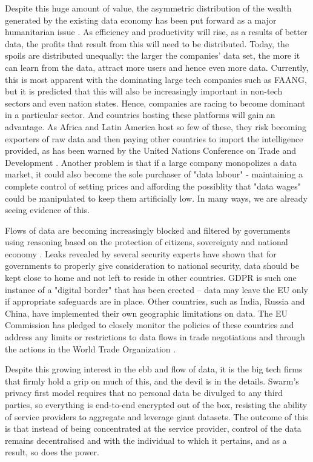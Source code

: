 Despite this huge amount of value, the asymmetric distribution of the wealth generated by the existing data economy has been put forward as a major humanitarian issue \cite{TheWinner2020Feb}. As efficiency and productivity will rise, as a results of better data, the profits that result from this will need to be distributed. Today, the spoils are distributed unequally: the larger the companies' data set, the more it can learn from the data, attract more users and hence even more data. Currently, this is most apparent with the dominating large tech companies such as FAANG, but it is predicted that this will also be increasingly important in non-tech sectors and even nation states. Hence, companies are racing to become dominant in a particular sector. And countries hosting these platforms will gain an advantage. As Africa and Latin America host so few of these, they risk becoming exporters of raw data and then paying other countries to import the intelligence provided, as has been warned by the United Nations Conference on Trade and Development \cite{TheWinner2020Feb}. Another problem is that if a large company monopolizes a data market, it could also become the sole purchaser of "data labour" - maintaining a complete control of setting prices and affording the possiblity that "data wages" could be manipulated to keep them artificially low. In many ways, we are already seeing evidence of this. 


Flows of data are becoming increasingly blocked and filtered by governments using reasoning based on the protection of citizens, sovereignty and national economy \cite{VirtualNationalism2020Feb}. Leaks revealed by several security experts have shown that for governments to properly give consideration to national security,  data should be kept close to home and not left to reside in other countries. GDPR is such one instance of a "digital border" that has been erected -- data may leave the EU only if appropriate safeguards are in place. Other countries, such as India, Russia and China, have implemented their own geographic limitations on data. The EU Commission has pledged to closely monitor the policies of these countries and address any limits or restrictions to data flows in trade negotiations and through the actions in the World Trade Organization \cite{EUWhitePaperAI2020Feb}.

Despite this growing interest in the ebb and flow of data, it is the big tech firms that firmly hold a grip on much of this, and the devil is in the details. Swarm's privacy first model requires that no personal data be divulged to any third parties, so everything is end-to-end encrypted out of the box, resisting the ability of service providers to aggregate and leverage giant datasets. The outcome of this is that instead of being concentrated at the service provider, control of the data remains decentralised and with the individual to which it pertains, and as a result, so does the power.

